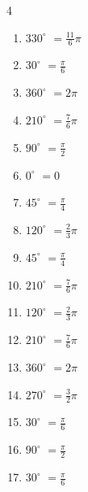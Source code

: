 \begin{multicols}{4}
\begin{enumerate}
  \item $\displaystyle 330^{\circ}$
        $\displaystyle =\frac{11}{6}\pi$

  \item $\displaystyle 30^{\circ}$
        $\displaystyle =\frac{\pi}{6}$

  \item $\displaystyle 360^{\circ}$
        $\displaystyle =2\pi$

  \item $\displaystyle 210^{\circ}$
        $\displaystyle =\frac{7}{6}\pi$

  \item $\displaystyle 90^{\circ}$
        $\displaystyle =\frac{\pi}{2}$

  \item $\displaystyle 0^{\circ}$
        $\displaystyle =0$

  \item $\displaystyle 45^{\circ}$
        $\displaystyle =\frac{\pi}{4}$

  \item $\displaystyle 120^{\circ}$
        $\displaystyle =\frac{2}{3}\pi$

  \item $\displaystyle 45^{\circ}$
        $\displaystyle =\frac{\pi}{4}$

  \item $\displaystyle 210^{\circ}$
        $\displaystyle =\frac{7}{6}\pi$

  \item $\displaystyle 120^{\circ}$
        $\displaystyle =\frac{2}{3}\pi$

  \item $\displaystyle 210^{\circ}$
        $\displaystyle =\frac{7}{6}\pi$

  \item $\displaystyle 360^{\circ}$
        $\displaystyle =2\pi$

  \item $\displaystyle 270^{\circ}$
        $\displaystyle =\frac{3}{2}\pi$

  \item $\displaystyle 30^{\circ}$
        $\displaystyle =\frac{\pi}{6}$

  \item $\displaystyle 90^{\circ}$
        $\displaystyle =\frac{\pi}{2}$

  \item $\displaystyle 30^{\circ}$
        $\displaystyle =\frac{\pi}{6}$


\end{enumerate}
\end{multicols}
